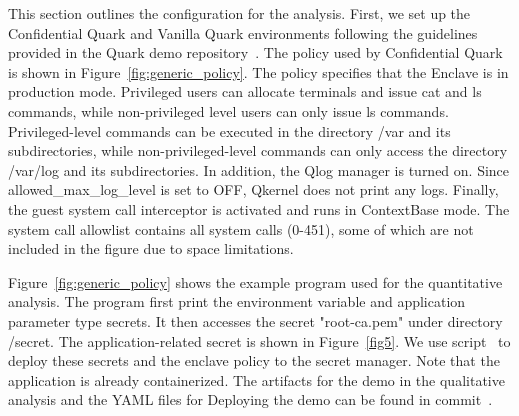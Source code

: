 This section outlines the configuration for the analysis. First, we set up the Confidential Quark and Vanilla Quark environments following the guidelines provided in the Quark demo repository~\cite*{Qaurk_Demo_for_qualitativ}. The policy used by Confidential Quark is shown in Figure~\ref{fig:generic_policy}. The policy specifies that the Enclave is in production mode. 
Privileged users can allocate terminals and issue cat and ls commands, while non-privileged level users can only issue ls commands. Privileged-level commands can be executed in the directory /var and its subdirectories, while non-privileged-level commands can only access the directory /var/log and its subdirectories. In addition, the Qlog manager is turned on. 
Since allowed\_max\_log\_level is set to OFF, Qkernel does not print any logs. Finally, the guest system call interceptor is activated and runs in ContextBase mode. The system call allowlist contains all system calls (0-451), some of which are not included in the figure due to space limitations.


Figure~\ref{fig:generic_policy} shows the example program used for the quantitative analysis. The program first print the environment variable and application parameter type secrets. It then accesses the secret "root-ca.pem" under directory /secret. The application-related secret is shown in Figure~\ref{fig5}. We use script~\cite*{secret_uploading_script} to deploy these secrets and the enclave 
policy to the secret manager. Note that the application is already containerized. The artifacts for the demo in the qualitative analysis and the YAML files for Deploying the demo can be found in commit~\cite*{artifacts_quarlitative}.

